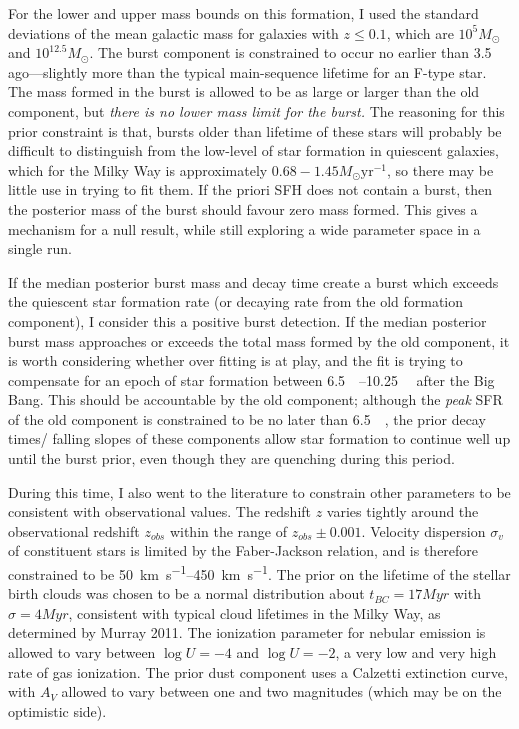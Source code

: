 \documentclass[a4paper,12pt]{article}
\begin{document}
\noindent For the lower and upper mass bounds on this formation, I used the
standard deviations of the mean galactic mass for galaxies with $z \leq 0.1$,
which are $10^{5}M_\odot$ and $10^{12.5}M_\odot$.\cite{Baldry_2012,
Wright_2017} The burst component is constrained to occur no earlier than
\SI{3.5}{\giga\year} ago---slightly more than the typical main-sequence
lifetime for an F-type star. The mass formed in the burst is allowed to be as
large or larger than the old component, but \textit{there is no lower mass
limit for the burst.} The reasoning for this prior constraint is that, bursts
older than lifetime of these stars will probably be difficult to distinguish
from the low-level of star formation in quiescent galaxies, which for the Milky
Way is approximately $0.68-1.45M_\odot\mathrm{yr}^{-1}$, so there may be little
use in trying to fit them.\cite{Robitaille_2010} If the priori SFH does not
contain a burst, then the posterior mass of the burst should favour zero mass
formed. This gives a mechanism for a null result, while still exploring a wide
parameter space in a single run.

If the median posterior burst mass and decay time create a burst which exceeds
the quiescent star formation rate (or decaying rate from the old formation
component), I consider this a positive burst detection. If the median posterior
burst mass approaches or exceeds the total mass formed by the old component, it
is worth considering whether over fitting is at play, and the fit is trying to
compensate for an epoch of star formation between
\SIrange{6.5}{10.25}{\giga\year} after the Big Bang. This should be accountable
by the old component; although the \textit{peak} SFR of the old component is
constrained to be no later than \SI{6.5}{\giga\year}, the prior decay times/
falling slopes of these components allow star formation to continue well up
until the burst prior, even though they are quenching during this period.

During this time, I also went to the literature to constrain other parameters
to be consistent with observational values. The redshift $z$ varies tightly
around the observational redshift $z_{obs}$ within the range of $z_{obs} \pm
0.001$. Velocity dispersion $\sigma_{v}$ of constituent stars is limited by the
Faber-Jackson relation, and is therefore constrained to be
\SIrange{50}{450}{\kilo\meter\per\second}.\cite{Minkowski_1962} The prior on
the lifetime of the stellar birth clouds was chosen to be a normal distribution
about ${t_{BC}=17Myr}$ with ${\sigma=4Myr}$, consistent with typical cloud
lifetimes in the Milky Way, as determined by Murray 2011.\cite{Murray_2011} The
ionization parameter for nebular emission is allowed to vary between $\log{U}=-
4$ and $\log{U}=-2$, a very low and very high rate of gas ionization. The prior
dust component uses a Calzetti extinction curve, with $A_V$ allowed to vary
between one and two magnitudes (which may be on the optimistic side).
\end{document}
